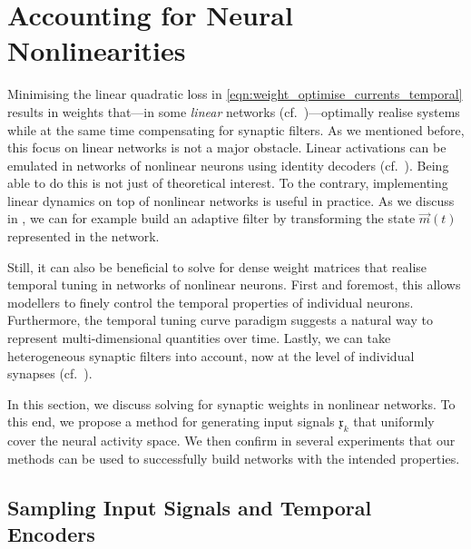 
\section{Accounting for Neural Nonlinearities}
\label{sec:recurrent_weights}

Minimising the linear quadratic loss in \cref{eqn:weight_optimise_currents_temporal} results in weights that---in some \emph{linear} networks (cf.~)---optimally realise \LTI systems while at the same time compensating for synaptic filters.
As we mentioned before, this focus on linear networks is not a major obstacle.
Linear activations can be emulated in networks of nonlinear neurons using \NEF identity decoders (cf.~).
Being able to do this is not just of theoretical interest. To the contrary, implementing linear dynamics on top of nonlinear networks is useful in practice.
As we discuss in , we can for example build an adaptive filter by transforming the state $\vec m(t)$ represented in the network.

Still, it can also be beneficial to solve for dense weight matrices that realise temporal tuning in networks of nonlinear neurons.
First and foremost, this allows modellers to finely control the temporal properties of individual neurons.
Furthermore, the temporal tuning curve paradigm suggests a natural way to represent multi-dimensional quantities over time.
Lastly, we can take heterogeneous synaptic filters into account, now at the level of individual synapses (cf.~).

In this section, we discuss solving for synaptic weights in nonlinear networks.
To this end, we propose a method for generating input signals $\mathfrak{x}_k$ that uniformly cover the neural activity space.
We then confirm in several experiments that our methods can be used to successfully build networks with the intended properties.

\subsection{Sampling Input Signals and Temporal Encoders}
\label{sec:solve_dynamics_nonlinear_neurons}

